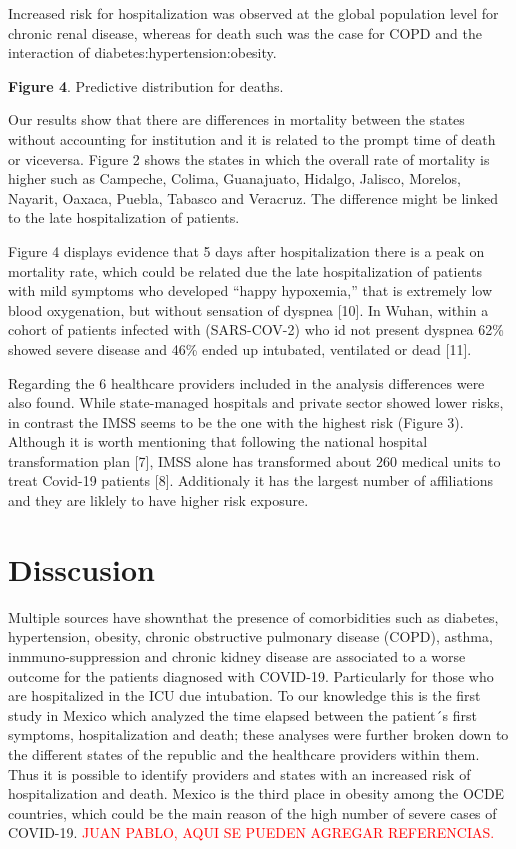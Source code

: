 \documentclass[10pt,letterpaper]{article}
\begin{document}
Increased risk for hospitalization was observed at the global population
level for chronic renal disease, whereas for death such was the case for
COPD and the interaction of diabetes:hypertension:obesity.

\textbf{Figure 4}. Predictive distribution for deaths.

Our results show that there are differences in mortality between the
states without accounting for institution and it is related to the
prompt time of death or viceversa. Figure 2 shows the states in which
the overall rate of mortality is higher such as Campeche, Colima,
Guanajuato, Hidalgo, Jalisco, Morelos, Nayarit, Oaxaca, Puebla, Tabasco
and Veracruz. The difference might be linked to the late hospitalization
of patients.

Figure 4 displays evidence that 5 days after hospitalization there is a
peak on mortality rate, which could be related due the late
hospitalization of patients with mild symptoms who developed ``happy
hypoxemia,'' that is extremely low blood oxygenation, but without
sensation of dyspnea {[}10{]}. In Wuhan, within a cohort of patients
infected with (SARS-COV-2) who id not present dyspnea 62\% showed severe
disease and 46\% ended up intubated, ventilated or dead {[}11{]}.

Regarding the 6 healthcare providers included in the analysis
differences were also found. While state-managed hospitals and private
sector showed lower risks, in contrast the IMSS seems to be the one with
the highest risk (Figure 3). Although it is worth mentioning that
following the national hospital transformation plan {[}7{]}, IMSS alone
has transformed about 260 medical units to treat Covid-19 patients
{[}8{]}. Additionaly it has the largest number of affiliations and they
are liklely to have higher risk exposure.

\section{Disscusion}\label{disscusion}

Multiple sources have shownthat the presence of comorbidities such as
diabetes, hypertension, obesity, chronic obstructive pulmonary disease
(COPD), asthma, inmmuno-suppression and chronic kidney disease are
associated to a worse outcome for the patients diagnosed with COVID-19.
Particularly for those who are hospitalized in the ICU due intubation.
To our knowledge this is the first study in Mexico which analyzed the
time elapsed between the patient´s first symptoms, hospitalization and
death; these analyses were further broken down to the different states
of the republic and the healthcare providers within them. Thus it is
possible to identify providers and states with an increased risk of
hospitalization and death. Mexico is the third place in obesity among
the OCDE countries, which could be the main reason of the high number of
severe cases of COVID-19.
\textcolor{red}{JUAN PABLO, AQUI SE PUEDEN AGREGAR REFERENCIAS.}
\end{document}
